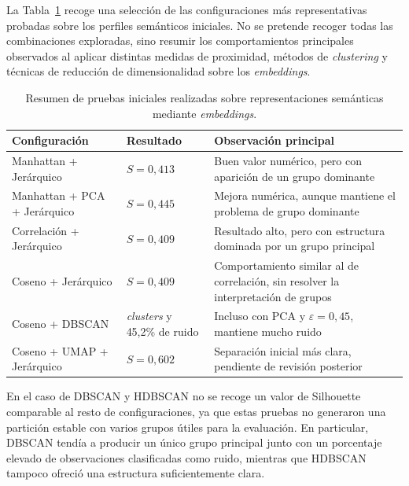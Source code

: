 \documentclass[11pt,spanish,listoffigures,listoftables]{tfgetsinf}
\begin{document}
La Tabla~\ref{tab:pruebas_embeddings_iniciales} recoge una selección de las configuraciones más representativas probadas sobre los perfiles semánticos iniciales. No se pretende recoger todas las combinaciones exploradas, sino resumir los comportamientos principales observados al aplicar distintas medidas de proximidad, métodos de \textit{clustering} y técnicas de reducción de dimensionalidad sobre los \textit{embeddings}.

\begin{table}[H]
\centering
\small
\renewcommand{\arraystretch}{1.25}
\begin{tabular}{
>{\centering\arraybackslash}m{}
>{\centering\arraybackslash}m{}
m{}
}
\hline
\textbf{Configuración} & \textbf{Resultado} & \textbf{Observación principal} \\
\hline
Manhattan + Jerárquico & \(S=0,413\) & Buen valor numérico, pero con aparición de un grupo dominante \\
\hline
Manhattan + PCA + Jerárquico & \(S=0,445\) & Mejora numérica, aunque mantiene el problema de grupo dominante \\
\hline
Correlación + Jerárquico & \(S=0,409\) & Resultado alto, pero con estructura dominada por un grupo principal \\
\hline
Coseno + Jerárquico & \(S=0,409\) & Comportamiento similar al de correlación, sin resolver la interpretación de grupos \\
\hline
Coseno + DBSCAN & 2 \textit{clusters} y 45,2\% de ruido & Incluso con PCA y \(\varepsilon=0,45\), mantiene mucho ruido \\
\hline
Coseno + UMAP + Jerárquico & \(S=0,602\) & Separación inicial más clara, pendiente de revisión posterior \\
\hline
\end{tabular}
\caption{Resumen de pruebas iniciales realizadas sobre representaciones semánticas mediante \textit{embeddings}.}
\label{tab:pruebas_embeddings_iniciales}
\end{table}

En el caso de DBSCAN y HDBSCAN no se recoge un valor de Silhouette comparable al resto de configuraciones, ya que estas pruebas no generaron una partición estable con varios grupos útiles para la evaluación. En particular, DBSCAN tendía a producir un único grupo principal junto con un porcentaje elevado de observaciones clasificadas como ruido, mientras que HDBSCAN tampoco ofreció una estructura suficientemente clara.
\end{document}
